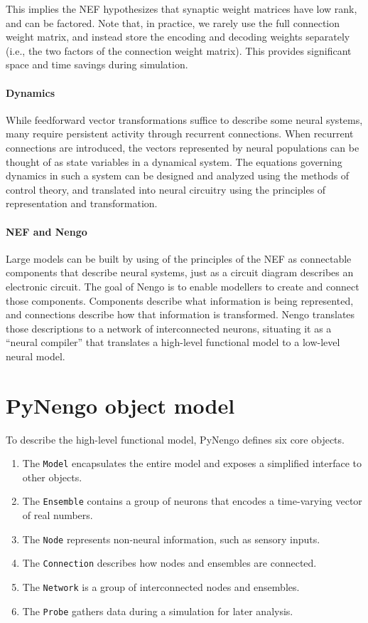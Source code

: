 \documentclass{frontiersSCNS}
\begin{document}
This implies the NEF hypothesizes
that synaptic weight matrices
have low rank, and can be factored.
Note that, in practice, we rarely use
the full connection weight matrix,
and instead store
the encoding and decoding weights separately
(i.e., the two factors of the connection weight matrix).
This provides significant
space and time savings during simulation.

\paragraph{Dynamics}
While feedforward vector transformations
suffice to describe
some neural systems,
many require persistent activity through recurrent connections.
When recurrent connections are introduced,
the vectors represented by neural populations
can be thought of as state variables
in a dynamical system.
The equations governing dynamics
in such a system
can be designed and analyzed
using the methods of control theory,
and translated into neural circuitry
using the principles
of representation and transformation.

\paragraph{NEF and Nengo}
Large models can be built
by using of the principles of the NEF
as connectable components
that describe neural systems,
just as a circuit diagram
describes an electronic circuit.
The goal of Nengo is to enable
modellers to create and connect those components.
Components describe
what information is being represented,
and connections describe
how that information is transformed.
Nengo translates those descriptions
to a network of interconnected neurons,
situating it as a ``neural compiler''
that translates
a high-level functional model
to a low-level neural model.

\section{PyNengo object model}

To describe the high-level functional model,
PyNengo defines six core objects.
\begin{enumerate}
  \item The \texttt{Model} encapsulates the entire model and
    exposes a simplified interface to other objects.
  \item The \texttt{Ensemble} contains a group of neurons
    that encodes a time-varying vector of real numbers.
  \item The \texttt{Node} represents non-neural information,
    such as sensory inputs.
  \item The \texttt{Connection} describes how
    nodes and ensembles are connected.
  \item The \texttt{Network} is a group of interconnected
    nodes and ensembles.
  \item The \texttt{Probe} gathers data during a simulation
    for later analysis.
\end{enumerate}
\end{document}
